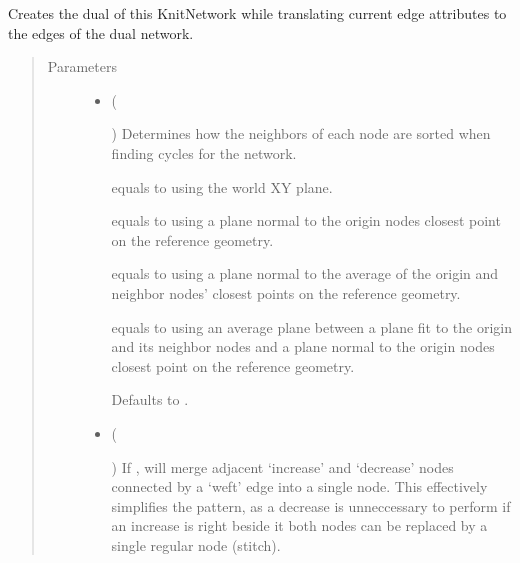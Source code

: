 \documentclass[letterpaper,10pt,english]{sphinxmanual}
\begin{document}
\begin{fulllineitems}
\begin{fulllineitems}
\label{\detokenize{cockatoo:cockatoo.KnitNetwork.create_dual}}
Creates the dual of this KnitNetwork while translating current edge
attributes to the edges of the dual network.
\begin{quote}\begin{description}
\item[{Parameters}] \leavevmode\begin{itemize}
\item {} 
 (%
\begin{footnote}[119]\sphinxAtStartFootnote
{}
%
\end{footnote}\sphinxstyleliteralemphasis{\sphinxupquote{, }}) \textendash{} 
Determines how the neighbors of each node are sorted when finding
cycles for the network.

 equals to using the world XY plane.

 equals to using a plane normal to the origin nodes closest
point on the reference geometry.

 equals to using a plane normal to the average of the origin
and neighbor nodes’ closest points on the reference geometry.

 equals to using an average plane between a plane fit to the
origin and its neighbor nodes and a plane normal to the origin
nodes closest point on the reference geometry.

Defaults to .


\item {} 
 (%
\begin{footnote}[120]\sphinxAtStartFootnote
{}
%
\end{footnote}\sphinxstyleliteralemphasis{\sphinxupquote{, }}) \textendash{} 
If , will merge adjacent ‘increase’ and ‘decrease’ nodes
connected by a ‘weft’ edge into a single node. This effectively
simplifies the pattern, as a decrease is unneccessary to perform
if an increase is right beside it \sphinxhyphen{} both nodes can be replaced by a
single regular node (stitch).


\end{itemize}
\end{description}
\end{quote}
\end{fulllineitems}
\end{fulllineitems}
\end{document}
